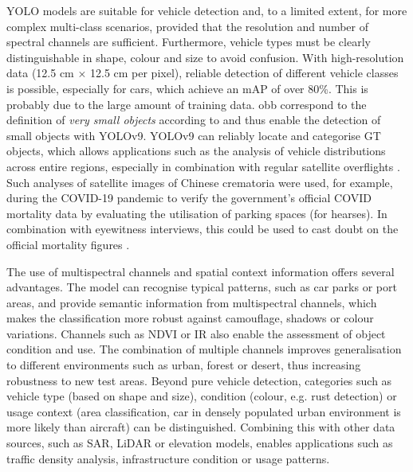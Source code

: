 YOLO models are suitable for vehicle detection and, to a limited extent, for more complex multi-class scenarios, provided that the resolution and number of spectral channels are sufficient. Furthermore, vehicle types must be clearly distinguishable in shape, colour and size to avoid confusion. With high-resolution data (12.5 cm × 12.5 cm per pixel), reliable detection of different vehicle classes is possible, especially for cars, which achieve an mAP of over 80\%. This is probably due to the large amount of training data. \acrshort{obb} correspond to the definition of \textit{very small objects} according to \citeauthor{Chen2017} \cite{Chen2017} and thus enable the detection of small objects with \acrshort{YOLO}v9.  \acrshort{YOLO}v9 can reliably locate and categorise \Acrlong{GT} objects, which allows applications such as the analysis of vehicle distributions across entire regions, especially in combination with regular satellite overflights \cite{planet_labs, airbus_neo}. Such analyses of satellite images of Chinese crematoria were used, for example, during the COVID-19 pandemic to verify the government's official COVID mortality data by evaluating the utilisation of parking spaces (for hearses). In combination with eyewitness interviews, this could be used to cast doubt on the official mortality figures \cite{Spiegel_article}.  

The use of multispectral channels and spatial context information offers several advantages. The model can recognise typical patterns, such as car parks or port areas, and provide semantic information from multispectral channels, which makes the classification more robust against camouflage, shadows or colour variations. Channels such as \acrshort{NDVI} or \acrshort{IR} also enable the assessment of object condition and use. The combination of multiple channels improves generalisation to different environments such as urban, forest or desert, thus increasing robustness to new test areas. Beyond pure vehicle detection, categories such as vehicle type (based on shape and size), condition (colour, e.g. rust detection) or usage context (area classification, car in densely populated urban environment is more likely than aircraft) can be distinguished. Combining this with other data sources, such as \acrshort{SAR}, \acrshort{LiDAR} or elevation models, enables applications such as traffic density analysis, infrastructure condition or usage patterns.



